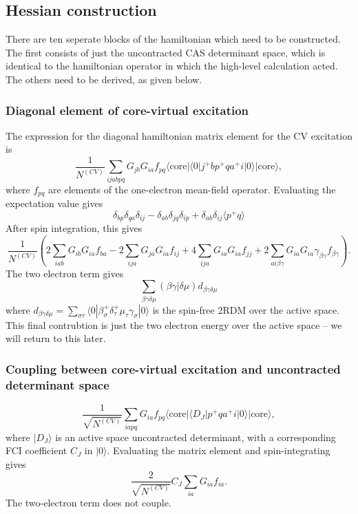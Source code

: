 \documentclass[a4paper,oneside,11pt]{article}
\numberwithin{equation}{section}
\newcommand{\DMETBra}{\langle \mathrm{core}|\langle 0|}
\newcommand{\DMETKet}{|0\rangle| \mathrm{core} \rangle}
\begin{document}
\subsection{Hessian construction}
There are ten seperate blocks of the hamiltonian which need to be constructed. The first consists of just the uncontracted CAS determinant space, which is identical to the hamiltonian operator
in which the high-level calculation acted. The others need to be derived, as given below.

\subsubsection{Diagonal element of core-virtual excitation}
The expression for the diagonal hamiltonian matrix element for the CV excitation is
\begin{equation}
\frac{1}{N^{(CV)}}\sum_{ijabpq} G_{jb} G_{ia} f_{pq} \DMETBra j^{+} b p^{+} q a^{+} i \DMETKet ,
\end{equation}
where $f_{pq}$ are elements of the one-electron mean-field operator. Evaluating the expectation value gives
\begin{equation}
\delta_{bp} \delta_{qa} \delta_{ij} - \delta_{ab} \delta_{jq} \delta_{ip} + \delta_{ab} \delta_{ij} \langle p^{+} q \rangle
\end{equation}
After spin integration, this gives
\begin{equation}
\frac{1}{N^{(CV)}} \left( 2\sum_{iab} G_{ib} G_{ia} f_{ba} - 2\sum_{ija} G_{ja} G_{ia} f_{ij} + 4 \sum_{ija} G_{ia} G_{ia} f_{jj} + 2 \sum_{ai \beta \gamma} G_{ia} G_{ia} \gamma_{\beta \gamma} f_{\beta \gamma} \right) . \label{1eCVDiag}
\end{equation}
The two electron term gives
\begin{equation}
\sum_{\beta \gamma \delta \mu} (\beta \gamma | \delta \mu) d_{\beta \gamma \delta \mu}  \label{2eCVDiag}
\end{equation}
where $d_{\beta \gamma \delta \mu} = \sum_{\sigma \tau} \langle 0| \beta^{+}_{\sigma} \delta^{+}_{\tau} \mu_{\tau} \gamma_{\sigma} | 0 \rangle$ is the spin-free 2RDM over the active space. 
This final contrubtion is just the two electron energy over the active space -- we will return to this later.

\subsubsection{Coupling between core-virtual excitation and uncontracted determinant space}
\begin{equation}
\frac{1}{\sqrt{N^{(CV)}}} \sum_{iapq} G_{ia} f_{pq} \langle \textrm{core} |\langle D_J | p^{+} q a^{+} i \DMETKet ,
\end{equation}
where $| D_J \rangle$ is an active space uncontracted determinant, with a corresponding FCI coefficient $C_J$ in $|0\rangle$. Evaluating the matrix element and spin-integrating gives
\begin{equation}
\frac{2}{\sqrt{N^{(CV)}}} C_J \sum_{ia} G_{ia} f_{ia} .
\end{equation}
The two-electron term does not couple.
\end{document}
